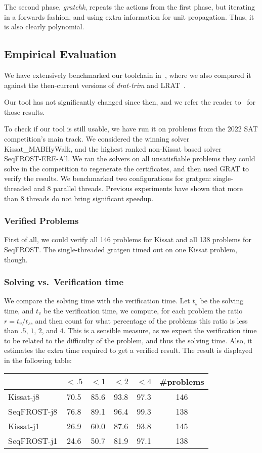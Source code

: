 \documentclass[conference]{IEEEtran}
\begin{document}
The second phase, {\sl gratchk}, repeats the actions from the first phase, but iterating in a forwards fashion, and using extra information for unit propagation. Thus, it is also clearly polynomial.


\subsection{Empirical Evaluation}
  We have extensively benchmarked our toolchain in~\cite{La20}, where we also compared it
  against the then-current versions of {\sl drat-trim} and LRAT~\cite{HHKW17}.

  Our tool has not significantly changed since then, and we refer the reader to~\cite{La20} for those results.

  To check if our tool is still usable, we have run it on problems from the 2022 SAT competition's main track.
  We considered the winning solver Kissat\_MAB\-HyWalk, and the highest ranked non-Kissat based solver SeqFROST-ERE-All. We ran the solvers on all unsatisfiable problems they could solve in the competition to regenerate the certificates, and then used GRAT to verify the results.
  We benchmarked two configurations for gratgen: single-threaded and 8 parallel threads.
  Previous experiments have shown that more than 8 threads do not bring significant speedup.

  \subsubsection{Verified Problems}
  First of all, we could verify all 146 problems for Kissat and all 138 problems for SeqFROST.
  The single-threaded gratgen timed out on one Kissat problem, though.

  \subsubsection{Solving vs.\ Verification time}
  We compare the solving time with the verification time. Let $t_s$ be the solving time, and $t_v$ be the verification time, we compute, for each problem the ratio $r=t_v/t_s$, and then count for what percentage of the problems this ratio is less than $.5$, $1$, $2$, and $4$. This is a sensible measure, as we expect the verification time to be related to the difficulty of the problem, and thus the solving time. Also, it estimates the extra time required to get a verified result.
  The result is displayed in the following table:

  {\vspace{1em}
  \begin{tabular}{|l|c|c|c|c|c|}\hline
                & $<.5$ & $<1$ & $<2$ & $<4$ & \#problems\\
    \hline\hline
    Kissat-j8   & 70.5 & 85.6 & 93.8 & 97.3  & 146 \\
    SeqFROST-j8 & 76.8 & 89.1 & 96.4 & 99.3  & 138 \\
    Kissat-j1   & 26.9 & 60.0 & 87.6 & 93.8  & 145 \\
    SeqFROST-j1 & 24.6 & 50.7 & 81.9 & 97.1  & 138 \\
    \hline
  \end{tabular}
  \vspace{1em}
  }
\end{document}
